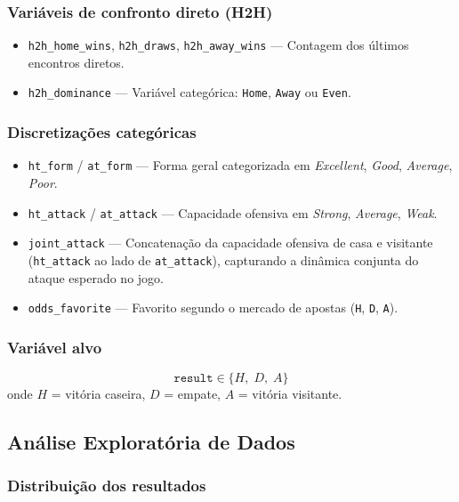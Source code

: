 \documentclass[12pt, a4paper]{article}
\begin{document}
\subsubsection{Variáveis de confronto direto (H2H)}

\begin{itemize}
  \item \texttt{h2h\_home\_wins}, \texttt{h2h\_draws}, \texttt{h2h\_away\_wins} — Contagem dos últimos encontros diretos.
  \item \texttt{h2h\_dominance} — Variável categórica: \texttt{Home}, \texttt{Away} ou \texttt{Even}.
\end{itemize}

\subsubsection{Discretizações categóricas}

\begin{itemize}
  \item \texttt{ht\_form} / \texttt{at\_form} — Forma geral categorizada em \textit{Excellent}, \textit{Good}, \textit{Average}, \textit{Poor}.
  \item \texttt{ht\_attack} / \texttt{at\_attack} — Capacidade ofensiva em \textit{Strong}, \textit{Average}, \textit{Weak}.
  \item \texttt{joint\_attack} — Concatenação da capacidade ofensiva de casa e visitante (\texttt{ht\_attack} ao lado de \texttt{at\_attack}), capturando a dinâmica conjunta do ataque esperado no jogo.
  \item \texttt{odds\_favorite} — Favorito segundo o mercado de apostas (\texttt{H}, \texttt{D}, \texttt{A}).
\end{itemize}

\subsubsection{Variável alvo}

\[
  \texttt{result} \in \{H,\; D,\; A\}
\]
onde $H$ = vitória caseira, $D$ = empate, $A$ = vitória visitante.

\subsection{Análise Exploratória de Dados}

\subsubsection{Distribuição dos resultados}
\end{document}
